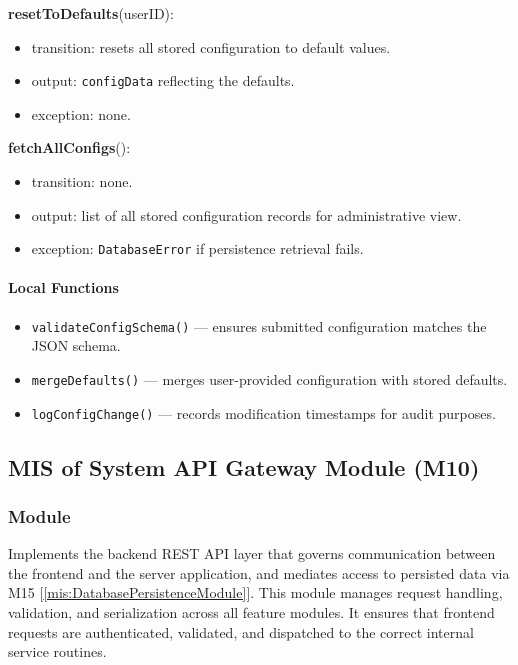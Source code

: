 \documentclass[12pt, titlepage]{article}
\begin{document}
\noindent \textbf{resetToDefaults}(userID):
\begin{itemize}
  \item transition: resets all stored configuration to default values.
  \item output: \texttt{configData} reflecting the defaults.
  \item exception: none.
\end{itemize}

\noindent \textbf{fetchAllConfigs}():
\begin{itemize}
  \item transition: none.
  \item output: list of all stored configuration records for administrative view.
  \item exception: \texttt{DatabaseError} if persistence retrieval fails.
\end{itemize}

\paragraph{Local Functions}
\begin{itemize}
  \item \texttt{validateConfigSchema()} — ensures submitted configuration matches the JSON schema.
  \item \texttt{mergeDefaults()} — merges user-provided configuration with stored defaults.
  \item \texttt{logConfigChange()} — records modification timestamps for audit purposes.
\end{itemize}


\subsection{MIS of System API Gateway Module (M10)}
  \label{mis:SystemAPIGateway}

  \subsubsection{Module}
  Implements the backend REST API layer that governs communication between the frontend and the server application, and mediates access to persisted data via M15 [\ref{mis:DatabasePersistenceModule}].
  This module manages request handling, validation, and serialization across all feature modules.
  It ensures that frontend requests are authenticated, validated, and dispatched to the correct internal service routines.
\end{document}
